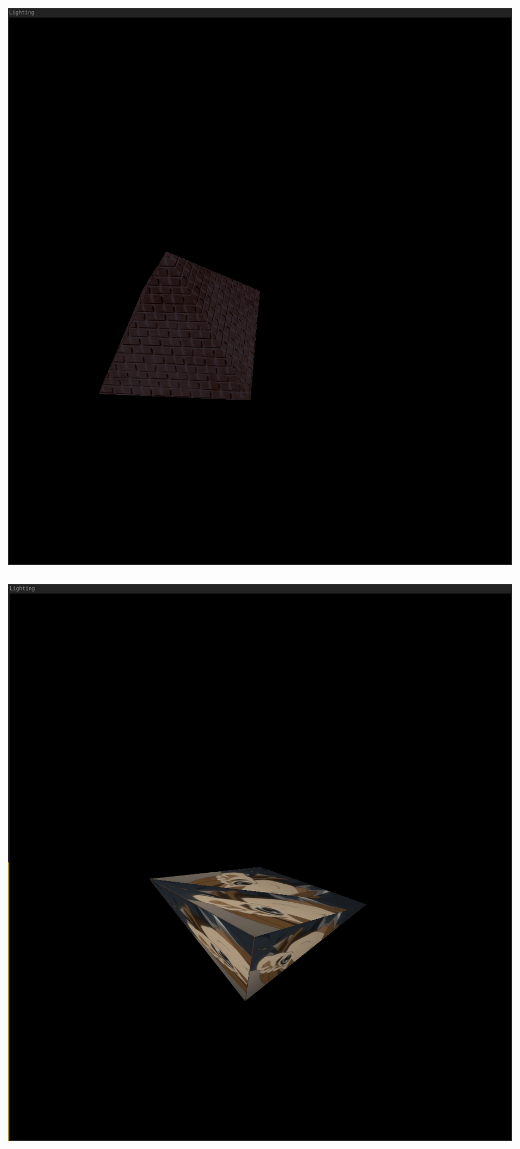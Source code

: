 \documentclass[polish,polish,a4paper]{report}
\begin{document}
\begin{center}
\includegraphics[scale=2]{texpyra2}
\end{center}

\begin{center}
\includegraphics[scale=2]{yuipyra.png}
\end{center}
\end{document}
